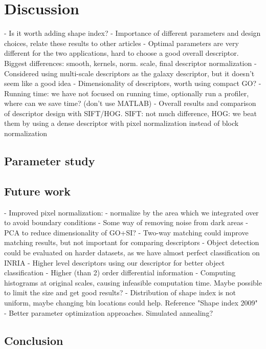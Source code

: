 \documentclass[thesis.tex]{subfiles}
\begin{document}
\chapter{Discussion}

- Is it worth adding shape index?
- Importance of different parameters and design choices, relate these results to other articles
- Optimal parameters are very different for the two applications, hard to choose a good overall descriptor. Biggest differences: smooth, kernels, norm. scale, final descriptor normalization
- Considered using multi-scale descriptors as the galaxy descriptor, but it doesn't seem like a good idea
- Dimensionality of descriptors, worth using compact GO?
- Running time: we have not focused on running time, optionally run a profiler, where can we save time? (don't use MATLAB)
- Overall results and comparison of descriptor design with SIFT/HOG. SIFT: not much difference, HOG: we beat them by using a dense descriptor with pixel normalization instead of block normalization

\section{Parameter study}


\section{Future work} %
- Improved pixel normalization:
	- normalize by the area which we integrated over to avoid boundary conditions
	- Some way of removing noise from dark areas
- PCA to reduce dimensionality of GO+SI?
- Two-way matching could improve matching results, but not important for comparing descriptors
- Object detection could be evaluated on harder datasets, as we have almost perfect classification on INRIA
- Higher level descriptors using our descriptor for better object classification
- Higher (than 2) order differential information
- Computing histograms at original scales, causing infeasible computation time. Maybe possible to limit the size and get good results?
- Distribution of shape index is not uniform, maybe changing bin locations could help. Reference "Shape index 2009"
- Better parameter optimization approaches. Simulated annealing?

\section{Conclusion}

\subbibliography
\end{document}
